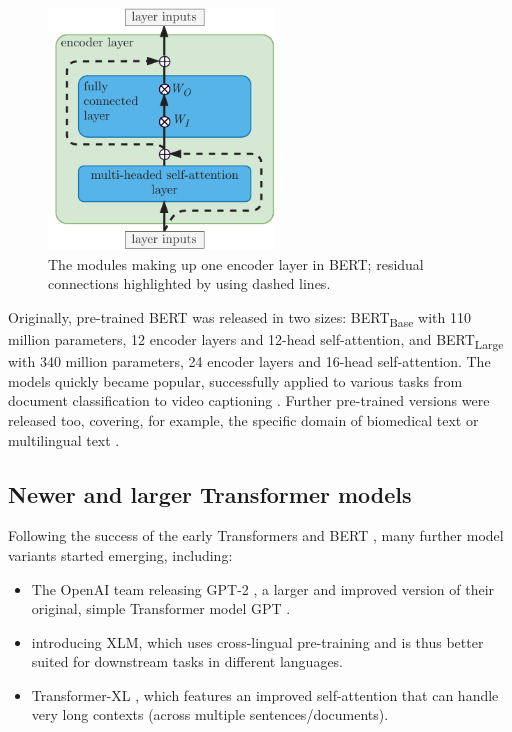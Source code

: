 \documentclass[bsc,frontabs,twoside,singlespacing,parskip,deptreport]{infthesis}
\begin{document}
{{{      \begin{figure}[h!t]
        \centering
        \includegraphics[width=6cm]{graphics/bert-encoder-layer}
        \caption{The modules making up one encoder layer in BERT; residual connections highlighted by using dashed lines.}
        \label{fig:bert-encoder-layer}
      \end{figure}
      
      Originally, pre-trained BERT was released in two sizes: BERT\textsubscript{Base} with 110 million parameters, 12 encoder layers and 12-head self-attention, and BERT\textsubscript{Large} with 340 million parameters, 24 encoder layers and 16-head self-attention. The models quickly became popular, successfully applied to various tasks from document classification \citep{Adhikari_2019} to video captioning \citep{Sun_2019}. Further pre-trained versions were released too, covering, for example, the specific domain of biomedical text \citep{Lee_2019} or multilingual text \citep{Pires_2019}.
    }

    \subsection{Newer and larger Transformer models}{
      \label{sec:post-BERT-models}
      Following the success of the early Transformers and BERT \citep{Vaswani_2017,Radford_2018,Devlin_2018}, many further model variants started emerging, including:
      \begin{itemize}
        \item The OpenAI team releasing GPT-2 \citep{Radford_2019}, a larger and improved version of their original, simple Transformer model GPT \citep{Radford_2018}.
        \item \citet{Lample_2019} introducing XLM, which uses cross-lingual pre-training and is thus better suited for downstream tasks in different languages.
        \item Transformer-XL \citep{Dai_2019}, which features an improved self-attention that can handle very long contexts (across multiple sentences/documents).
      \end{itemize}

}}}
\end{document}
